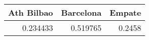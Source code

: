 \begin{tabular}{rrr}
\hline
   Ath Bilbao &   Barcelona &   Empate \\
\hline
     0.234433 &    0.519765 &   0.2458 \\
\hline
\end{tabular}